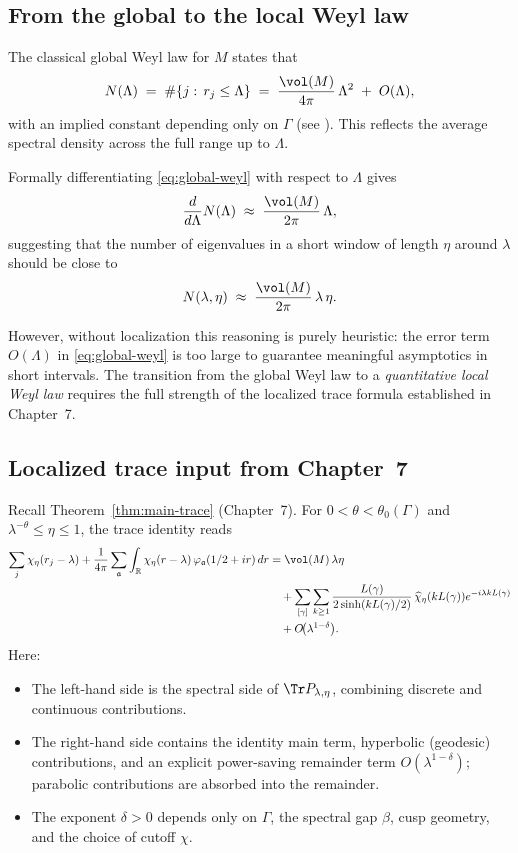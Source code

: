 \subsection{From the global to the local Weyl law}

The classical global Weyl law for $M$ states that
\begin{equation}\label{eq:global-weyl}
N(\Lambda)\;=\;\#\{j:\, r_j\le \Lambda\}
\;=\;\frac{\vol(M)}{4\pi}\,\Lambda^{2} \;+\; O(\Lambda),
\end{equation}
with an implied constant depending only on $\Gamma$ (see \cite{Selberg1956, DG1975, Hejhal1983, Iwaniec2002}). This reflects the average spectral density across the full range up to $\Lambda$.

Formally differentiating \eqref{eq:global-weyl} with respect to $\Lambda$ gives
\[
\frac{d}{d\Lambda}N(\Lambda)\;\approx\;\frac{\vol(M)}{2\pi}\,\Lambda,
\]
suggesting that the number of eigenvalues in a short window of length $\eta$ around $\lambda$ should be close to
\[
N(\lambda,\eta)\;\approx\;\frac{\vol(M)}{2\pi}\,\lambda\,\eta.
\]

However, without localization this reasoning is purely heuristic: the error term $O(\Lambda)$ in \eqref{eq:global-weyl} is too large to guarantee meaningful asymptotics in short intervals. The transition from the global Weyl law to a \emph{quantitative local Weyl law} requires the full strength of the localized trace formula established in Chapter~7.

\subsection{Localized trace input from Chapter~7}

Recall Theorem~\ref{thm:main-trace} (Chapter~7). For $0<\theta<\theta_0(\Gamma)$ and $\lambda^{-\theta}\le \eta\le 1$, the trace identity reads
\begin{align}\label{eq:maintrace-input}
\sum_{j}\chi_\eta(r_j-\lambda)
+\frac{1}{4\pi}\sum_{\mathfrak{a}}
\int_{\mathbb{R}}\chi_\eta(r-\lambda)\,\varphi_{\mathfrak{a}}(1/2+ir)\,dr
&=\vol(M)\,\lambda\eta \\
&\quad+\sum_{[\gamma]}\sum_{k\ge 1}
\frac{L(\gamma)}{2\sinh(kL(\gamma)/2)}\,\widehat{\chi}_\eta(kL(\gamma))e^{-i\lambda kL(\gamma)} \nonumber\\
&\quad+O\!\big(\lambda^{1-\delta}\big). \nonumber
\end{align}
Here:
\begin{itemize}
\item The left-hand side is the spectral side of $\Tr P_{\lambda,\eta}$, combining discrete and continuous contributions.  
\item The right-hand side contains the identity main term, hyperbolic (geodesic) contributions, and an explicit power-saving remainder term $O(\lambda^{1-\delta})$; parabolic contributions are absorbed into the remainder.  
\item The exponent $\delta>0$ depends only on $\Gamma$, the spectral gap $\beta$, cusp geometry, and the choice of cutoff $\chi$.
\end{itemize}


